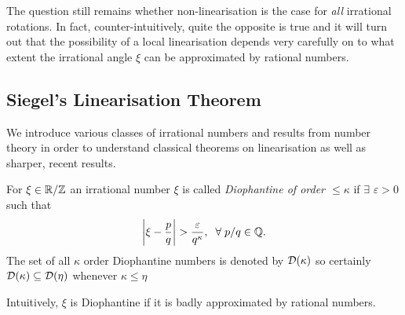 \documentclass[../main.tex]{subfiles}
\begin{document}
The question still remains whether non-linearisation is the case for \textit{all} irrational rotations. In fact, counter-intuitively, quite the opposite is true and it will turn out that the possibility of a local linearisation depends very carefully on to what extent the irrational angle $\xi$ can be approximated by rational numbers.

\subsection{Siegel's Linearisation Theorem}

We introduce various classes of irrational numbers and results from number theory in order to understand classical theorems on linearisation as well as sharper, recent results.

\begin{dfn} For $\xi \in \mathbb{R}/\mathbb{Z}$ an irrational number
$\xi$ is called \textit{Diophantine of order $\leq \kappa$} if $\exists$ $\varepsilon > 0$ such that
\[
\left|\xi - \frac{p}{q}\right| > \frac{\varepsilon}{q^\kappa}, \;\; \forall\; p/q \in \mathbb{Q}.
\]
The set of all $\kappa$ order Diophantine numbers is denoted by $\mathcal{D}(\kappa)$ so certainly $\mathcal{D}(\kappa) \subseteq \mathcal{D}(\eta)$ whenever $\kappa \le \eta$
\end{dfn}

Intuitively, $\xi$ is Diophantine if it is badly approximated by rational numbers.
\end{document}
